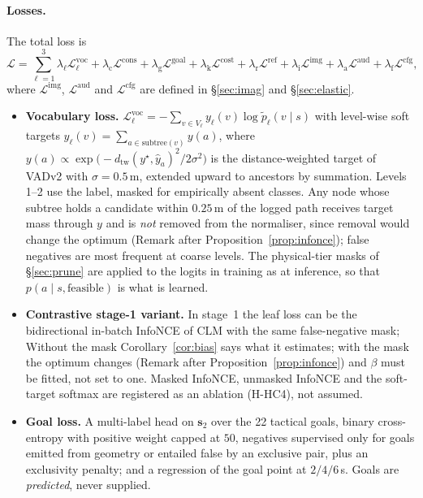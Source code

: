 \paragraph{Losses.} The total loss is
\begin{equation}
\mathcal L=\sum_{\ell=1}^{3}\lambda_\ell\mathcal L^{\text{voc}}_\ell+\lambda_{\text{c}}\mathcal L^{\text{cons}}+\lambda_{\text{g}}\mathcal L^{\text{goal}}+\lambda_{\text{k}}\mathcal L^{\text{cost}}+\lambda_{\text{r}}\mathcal L^{\text{ref}}+\lambda_{\text{i}}\mathcal L^{\text{img}}+\lambda_{\text{a}}\mathcal L^{\text{aud}}+\lambda_{\text{f}}\mathcal L^{\text{cfg}},
\end{equation}
where $\mathcal L^{\text{img}}$, $\mathcal L^{\text{aud}}$ and $\mathcal L^{\text{cfg}}$ are defined in \S\ref{sec:imag} and \S\ref{sec:elastic}.
\begin{itemize}
\item \textbf{Vocabulary loss.} $\mathcal L^{\text{voc}}_\ell=-\sum_{v\in V_\ell}y_\ell(v)\log\tilde p_\ell(v\mid s)$ with level-wise soft targets $y_\ell(v)=\sum_{a\in\mathrm{subtree}(v)}y(a)$, where $y(a)\propto\exp\!\big(-d_{\text{tw}}(y^\star,\hat y_a)^2/2\sigma^2\big)$ is the distance-weighted target of VADv2 \citep{chen2024vadv2} with $\sigma=0.5$\,m, extended upward to ancestors by summation. Levels 1--2 use the label, masked for empirically absent classes. Any node whose subtree holds a candidate within $0.25$\,m of the logged path receives target mass through $y$ and is \emph{not} removed from the normaliser, since removal would change the optimum (Remark after Proposition~\ref{prop:infonce}); false negatives are most frequent at coarse levels. The physical-tier masks of \S\ref{sec:prune} are applied to the logits in training as at inference, so that $p(a\mid s,\text{feasible})$ is what is learned.
\item \textbf{Contrastive stage-1 variant.} In stage~1 the leaf loss can be the bidirectional in-batch InfoNCE of CLM with the same false-negative mask; Without the mask Corollary~\ref{cor:bias} says what it estimates; with the mask the optimum changes (Remark after Proposition~\ref{prop:infonce}) and $\beta$ must be fitted, not set to one. Masked InfoNCE, unmasked InfoNCE and the soft-target softmax are registered as an ablation (H-HC4), not assumed.
\item \textbf{Goal loss.} A multi-label head on $\mathbf s_2$ over the 22 tactical goals, binary cross-entropy with positive weight capped at $50$, negatives supervised only for goals emitted from geometry or entailed false by an exclusive pair, plus an exclusivity penalty; and a regression of the goal point at $2/4/6$\,s. Goals are \emph{predicted}, never supplied.

\end{itemize}
